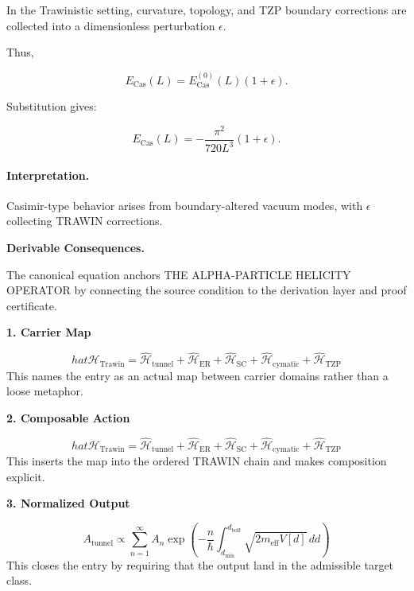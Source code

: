 In the Trawinistic setting, curvature, topology, and TZP boundary corrections are collected into a dimensionless perturbation $\epsilon$.

Thus,

\begin{equation}
E_{\mathrm{Cas}}(L)
=
E_{\mathrm{Cas}}^{(0)}(L)(1+\epsilon).
\end{equation}

Substitution gives:

\begin{equation}
\boxed{
E_{\mathrm{Cas}}(L)
=
-\frac{\pi^2}{720L^3}(1+\epsilon).
}
\end{equation}

\paragraph{Interpretation.}
Casimir-type behavior arises from boundary-altered vacuum modes, with $\epsilon$ collecting TRAWIN corrections.

\par\vspace{0.35em}
\noindent\textbf{Derivable Consequences.}\quad
\begingroup
\footnotesize
\raggedright
The canonical equation anchors THE ALPHA-PARTICLE HELICITY OPERATOR by connecting the source condition to the derivation layer and proof certificate.
\par\endgroup

\noindent\textbf{1. Carrier Map}\par
\[
hat{\mathcal{H}}_{\text{Trawin}} = \hat{\mathcal{H}}_{\text{tunnel}} + \hat{\mathcal{H}}_{\text{ER}} + \hat{\mathcal{H}}_{\text{SC}} + \hat{\mathcal{H}}_{\text{cymatic}} + \hat{\mathcal{H}}_{\text{TZP}}
\]
\noindent This names the entry as an actual map between carrier domains rather than a loose metaphor.\par
\noindent\textbf{2. Composable Action}\par
\[
hat{\mathcal{H}}_{\text{Trawin}} = \hat{\mathcal{H}}_{\text{tunnel}} + \hat{\mathcal{H}}_{\text{ER}} + \hat{\mathcal{H}}_{\text{SC}} + \hat{\mathcal{H}}_{\text{cymatic}} + \hat{\mathcal{H}}_{\text{TZP}}
\]
\noindent This inserts the map into the ordered TRAWIN chain and makes composition explicit.\par
\noindent\textbf{3. Normalized Output}\par
\[
A_{\text{tunnel}} \propto \sum_{n=1}^{\infty} A_n \exp\left(-\frac{n}{\hbar} \int_{d_{\min}}^{d_{\text{bolt}}} \sqrt{2m_{\text{eff}} V[d]} \, dd\right)
\]
\noindent This closes the entry by requiring that the output land in the admissible target class.\par

